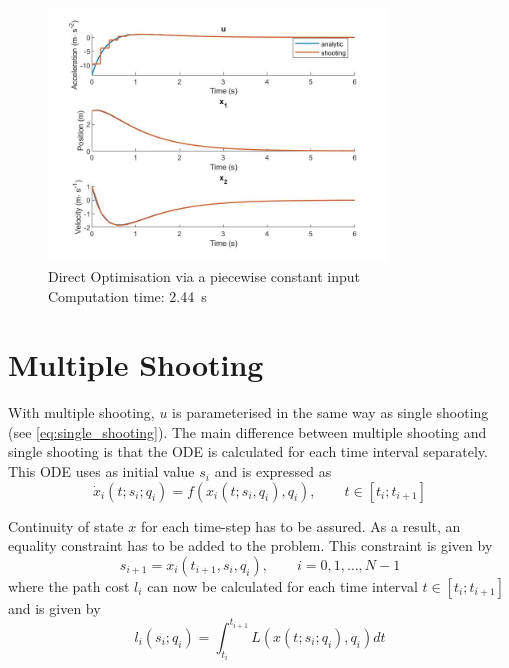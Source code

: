 \begin{figure}[h!]
\centering
\includegraphics[width=0.8\textwidth]{Images/solution_zoh.jpg}
\caption{Direct Optimisation via a piecewise constant input\\ Computation time: \SI{2.44}{\second}}
\label{fig:solution_zoh}
\end{figure}


\section{Multiple Shooting}

\par With multiple shooting, $u$ is parameterised in the same way as single shooting (see \ref{eq:single_shooting}). The main difference between multiple shooting and single shooting is that the ODE is calculated for each time interval separately. This ODE uses as initial value $s_i$ and is expressed as
\begin{equation}
    \dot{x}_i (t; s_i; q_i) = f(x_i(t;s_i,q_i),q_i), \qquad t\in [t_i; t_{i+1}]
    \label{eq:ode_multiple}
\end{equation}

\par Continuity of state $x$ for each time-step has to be assured. As a result, an equality constraint has to be added to the problem. This constraint is given by 
\begin{equation}
    \label{eq:shooting_constraint}
    s_{i+1} = x_i (t_{i+1}, s_i, q_i), \qquad i = 0,1,\dots, N-1
\end{equation}
where the path cost $l_i$ can now be calculated for each time interval $t \in [t_i; t_{i+1}]$ and is given by
\begin{equation}
    l_i(s_i;q_i) = \int_{t_i}^{t_{i+1}} L(x(t;s_i;q_i),q_i)dt 
\end{equation}

